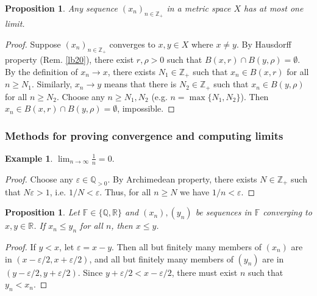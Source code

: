 \documentclass[12pt,b5paper,notitlepage]{article}
\theoremstyle{definition}
\newtheorem{eg}[df]{Example}
\theoremstyle{plain}
\newtheorem{pp}[df]{Proposition}
\newcommand{\Zbb}{\mathbb Z}
\newcommand{\Qbb}{\mathbb Q}
\newcommand{\Rbb}{\mathbb R}
\newcommand{\Fbb}{\mathbb F}
\newcommand{\dps}{\displaystyle}
\newcommand{\eps}{\varepsilon}
\numberwithin{equation}{section}
\begin{document}
\begin{pp}\label{lb21}
Any sequence $(x_n)_{n\in\Zbb_+}$ in a metric space $X$ has at most one limit.
\end{pp}

\begin{proof}
Suppose $(x_n)_{n\in\Zbb_+}$ converges to $x,y\in X$ where $x\neq y$. By Hausdorff property (Rem. \ref{lb20}), there exist $r,\rho>0$ such that $B(x,r)\cap B(y,\rho)=\emptyset$. By the definition of $x_n\rightarrow x$, there exists $N_1\in\Zbb_+$ such that $x_n\in B(x,r)$ for all $n\geq N_1$. Similarly, $x_n\rightarrow y$ means that there is $N_2\in\Zbb_+$ such that $x_n\in B(y,\rho)$ for all $n\geq N_2$. Choose any $n\geq N_1,N_2$ (e.g. $n=\max\{N_1,N_2\}$). Then $x_n\in B(x,r)\cap B(y,\rho)=\emptyset$, impossible.
\end{proof}


\subsubsection{Methods for proving convergence and computing limits}



\begin{eg}
$\dps \lim_{n\rightarrow\infty}\frac 1n=0$.
\end{eg}


\begin{proof}
Choose any $\varepsilon\in\Qbb_{>0}$. By Archimedean property, there exists $N\in\Zbb_+$ such that $N\varepsilon>1$, i.e. $1/N<\varepsilon$. Thus, for all $n\geq N$ we have $1/n<\varepsilon$.
\end{proof}

\begin{pp}
Let $\Fbb\in\{\Qbb,\Rbb\}$ and $(x_n),(y_n)$ be sequences in $\Fbb$ converging to $x,y\in\Rbb$. If $x_n\leq y_n$ for all $n$, then $x\leq y$.
\end{pp}

\begin{proof}
If $y<x$, let $\varepsilon=x-y$. Then all but finitely many members of $(x_n)$ are in $(x-\varepsilon/2,x+\varepsilon/2)$, and all but finitely many members of $(y_n)$ are in $(y-\varepsilon/2,y+\varepsilon/2)$. Since $y+\eps/2<x-\eps/2$, there must exist $n$ such that $y_n<x_n$.
\end{proof}
\end{document}
